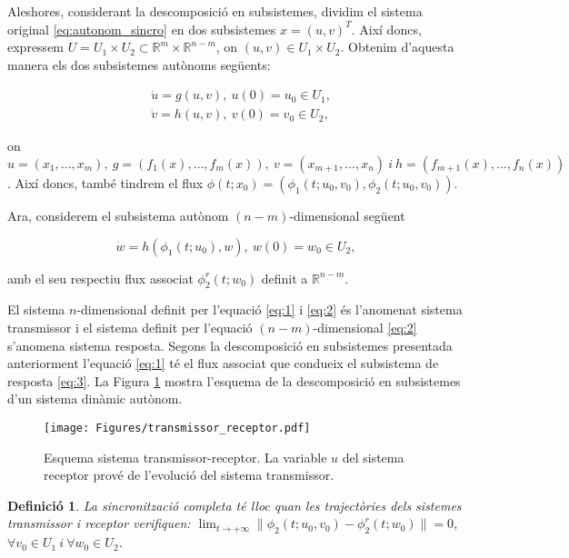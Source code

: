 \documentclass[11pt,a4paper,openright,oneside]{article}
\numberwithin{equation}{section}
\newtheorem{defi}[teo]{Definici\'o}
\theoremstyle{definition}
\begin{document}
Aleshores, considerant la descomposició en subsistemes, dividim el sistema original \eqref{eq:autonom_sincro} en dos subsistemes $x=(u, v)^T$. Així doncs, expressem $U=U_1\times U_2\subset \mathbb{R}^m\times\mathbb{R}^{n-m}$, on $(u,v)\in U_1\times U_2$. Obtenim d'aquesta manera els dos subsistemes autònoms següents:

\begin{align}
     &\dot{u}=g(u,v), \ u(0) = u_0 \in U_1, \label{eq:1} \\
     &\dot{v}=h(u,v), \ v(0) = v_0 \in U_2, \label{eq:2}
\end{align}

on $u=\left(x_1,\dots , x_m\right), \ g=\left(f_1(x), \ldots , f_m(x)\right), \ v=\left(x_{m+1}, \dots ,x_n\right) \ i \ h=\left(f_{m+1}(x), \dots , f_n(x)\right)$. Així doncs, també tindrem el flux $\phi(t;x_0)=\left(\phi_1(t;u_0,v_0),\phi_2(t;u_0,v_0)\right)$.

Ara, considerem el subsistema autònom $(n-m)$-dimensional següent

\begin{equation}\label{eq:3}
    \dot{w}=h\left(\phi_1(t; u_0), w\right), \ w(0)=w_0 \in U_2,
\end{equation}

amb el seu respectiu flux associat $\phi_2^r(t;w_0)$ definit a $\mathbb{R}^{n-m}$.

El sistema $n$-dimensional definit per l'equació \eqref{eq:1} i \eqref{eq:2} és l'anomenat sistema transmissor  i el sistema definit per l'equació $(n-m)$-dimensional \eqref{eq:2} s'anomena sistema resposta. Segons la descomposició en subsistemes presentada anteriorment l'equació \eqref{eq:1} té el flux associat que condueix el subsistema de resposta \eqref{eq:3}. La Figura \ref{fig:transmissor_receptor} mostra l'esquema de la descomposició en subsistemes d'un sistema dinàmic autònom. 

\begin{figure}[htbp]
    \centering
    \texttt{[image: Figures/transmissor\_receptor.pdf]}
    \caption{Esquema sistema transmissor-receptor. La variable $u$ del sistema receptor prové de l'evolució del sistema transmissor.}
    \label{fig:transmissor_receptor}
\end{figure}

\begin{defi} \label{sincrocompleta}
 La sincronització completa té lloc quan les trajectòries dels sistemes transmissor i receptor verifiquen: $\lim_{t \to +\infty}\|\phi_2(t;u_0, v_0)-\phi_2^r(t;w_0)\|=0$, $\forall v_0 \in U_1 \ i \ \forall w_0\in U_2$.
\end{defi}
\end{document}
